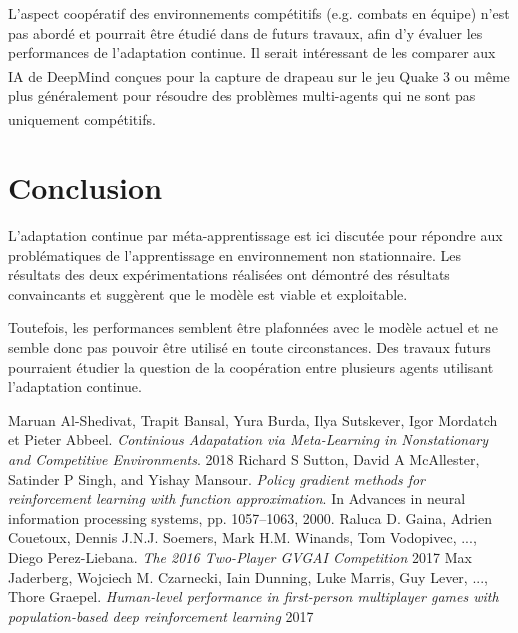 \documentclass[a4paper,11pt]{article}
\begin{document}
    L'aspect coopératif des environnements compétitifs (e.g. combats en équipe) n'est pas abordé et 
    pourrait être étudié dans de futurs travaux, afin d'y évaluer les performances de l'adaptation 
    continue. Il serait intéressant de les comparer aux IA de DeepMind conçues pour la capture de drapeau sur 
    le jeu Quake 3\textsuperscript{\cite{jaderberg}} ou même plus généralement pour résoudre des problèmes multi-agents qui ne 
    sont pas uniquement compétitifs\textsuperscript{\cite{raluca}}.

    \section{Conclusion}

    L'adaptation continue par méta-apprentissage est ici discutée pour répondre aux problématiques de l'apprentissage
    en environnement non stationnaire. Les résultats des deux expérimentations réalisées ont démontré
    des résultats convaincants et suggèrent que le modèle est viable et exploitable.

    Toutefois, les performances semblent être plafonnées avec le modèle actuel et ne semble donc pas 
    pouvoir être utilisé en toute circonstances. Des travaux futurs pourraient étudier la question de 
    la coopération entre plusieurs agents utilisant l'adaptation continue.

    \begin{thebibliography}{9}
        Maruan Al-Shedivat, Trapit Bansal, Yura Burda, Ilya Sutskever, Igor Mordatch et Pieter Abbeel.
        \emph{Continious Adapatation via Meta-Learning in Nonstationary and Competitive Environments}.
        2018
        Richard S Sutton, David A McAllester, Satinder P Singh, and Yishay Mansour.
        \emph{Policy gradient methods for reinforcement learning with function approximation}.
        In Advances in neural information processing systems, pp. 1057–1063, 2000.
        Raluca D. Gaina, Adrien Couetoux, Dennis J.N.J. Soemers, Mark H.M. Winands, Tom Vodopivec, ..., Diego Perez-Liebana.
        \emph{The 2016 Two-Player GVGAI Competition}
        2017
         Max Jaderberg, Wojciech M. Czarnecki, Iain Dunning, Luke Marris, Guy Lever, ..., Thore Graepel.
        \emph{Human-level performance in first-person multiplayer games with population-based deep reinforcement learning}
        2017
  
    \end{thebibliography}




 
  
\end{document}
